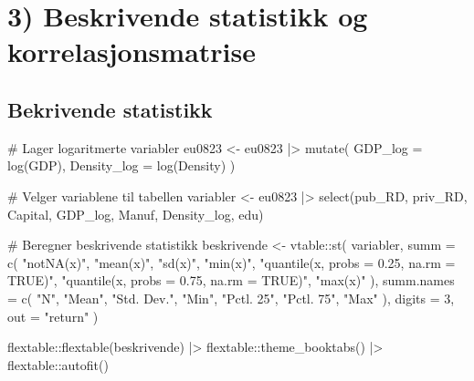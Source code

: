 \documentclass[
  letterpaper,
  DIV=11,
  numbers=noendperiod]{scrartcl}
\newenvironment{Shaded}{\begin{snugshade}}{\end{snugshade}}
\newcommand{\AttributeTok}[1]{\textcolor[rgb]{0.40,0.45,0.13}{#1}}
\newcommand{\CommentTok}[1]{\textcolor[rgb]{0.37,0.37,0.37}{#1}}
\newcommand{\DecValTok}[1]{\textcolor[rgb]{0.68,0.00,0.00}{#1}}
\newcommand{\FunctionTok}[1]{\textcolor[rgb]{0.28,0.35,0.67}{#1}}
\newcommand{\NormalTok}[1]{\textcolor[rgb]{0.00,0.23,0.31}{#1}}
\newcommand{\OtherTok}[1]{\textcolor[rgb]{0.00,0.23,0.31}{#1}}
\newcommand{\SpecialCharTok}[1]{\textcolor[rgb]{0.37,0.37,0.37}{#1}}
\newcommand{\StringTok}[1]{\textcolor[rgb]{0.13,0.47,0.30}{#1}}
\begin{document}
\section{3) Beskrivende statistikk og
korrelasjonsmatrise}\label{beskrivende-statistikk-og-korrelasjonsmatrise}

\subsection{Bekrivende statistikk}\label{bekrivende-statistikk}

\begin{Shaded}
\begin{Highlighting}[]
\CommentTok{\# Lager logaritmerte variabler}
\NormalTok{eu0823 }\OtherTok{\textless{}{-}}\NormalTok{ eu0823 }\SpecialCharTok{|\textgreater{}}
  \FunctionTok{mutate}\NormalTok{(}
    \AttributeTok{GDP\_log =} \FunctionTok{log}\NormalTok{(GDP),}
    \AttributeTok{Density\_log =} \FunctionTok{log}\NormalTok{(Density)}
\NormalTok{  )}

\CommentTok{\# Velger variablene til tabellen}
\NormalTok{variabler }\OtherTok{\textless{}{-}}\NormalTok{ eu0823 }\SpecialCharTok{|\textgreater{}}
  \FunctionTok{select}\NormalTok{(pub\_RD, priv\_RD, Capital, GDP\_log,}
\NormalTok{         Manuf, Density\_log, edu)}

\CommentTok{\# Beregner beskrivende statistikk}
\NormalTok{beskrivende }\OtherTok{\textless{}{-}}\NormalTok{ vtable}\SpecialCharTok{::}\FunctionTok{st}\NormalTok{(}
\NormalTok{  variabler,}
  \AttributeTok{summ =} \FunctionTok{c}\NormalTok{(}
    \StringTok{"notNA(x)"}\NormalTok{,}
    \StringTok{"mean(x)"}\NormalTok{,}
    \StringTok{"sd(x)"}\NormalTok{,}
    \StringTok{"min(x)"}\NormalTok{,}
    \StringTok{"quantile(x, probs = 0.25, na.rm = TRUE)"}\NormalTok{,}
    \StringTok{"quantile(x, probs = 0.75, na.rm = TRUE)"}\NormalTok{,}
    \StringTok{"max(x)"}
\NormalTok{  ),}
  \AttributeTok{summ.names =} \FunctionTok{c}\NormalTok{(}
    \StringTok{"N"}\NormalTok{, }\StringTok{"Mean"}\NormalTok{, }\StringTok{"Std. Dev."}\NormalTok{, }\StringTok{"Min"}\NormalTok{,}
    \StringTok{"Pctl. 25"}\NormalTok{, }\StringTok{"Pctl. 75"}\NormalTok{, }\StringTok{"Max"}
\NormalTok{  ),}
  \AttributeTok{digits =} \DecValTok{3}\NormalTok{,}
  \AttributeTok{out =} \StringTok{"return"}
\NormalTok{)}

\NormalTok{flextable}\SpecialCharTok{::}\FunctionTok{flextable}\NormalTok{(beskrivende) }\SpecialCharTok{|\textgreater{}}
\NormalTok{  flextable}\SpecialCharTok{::}\FunctionTok{theme\_booktabs}\NormalTok{() }\SpecialCharTok{|\textgreater{}}
\NormalTok{  flextable}\SpecialCharTok{::}\FunctionTok{autofit}\NormalTok{()}
\end{Highlighting}
\end{Shaded}
\end{document}
